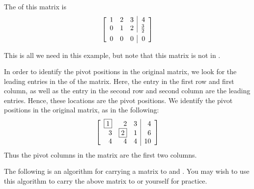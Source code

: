 \begin{solution} 
The \ef \;of this matrix is
\begin{equation*}
\leftB
\begin{array}{rrr|r}
1 & 2 & 3 & 4 \\
0 & 1 & 2 & \vspace{0.05in}\frac{3}{2} \\
0 & 0 & 0 & 0
\end{array}
\rightB
\end{equation*}




This is all we need in this example, but note that this matrix is not in \rref.

In order to identify the pivot positions in the original matrix, we look for the leading entries in the \ef \hspace{0.5mm} of the matrix. 
Here, the entry in the first row and first column, as well as the entry in the second row and second column 
are the leading entries. Hence, these locations are the pivot positions. We identify the pivot positions in the original matrix, 
as in the following:\
\begin{equation*}
\left[
\begin{array}{rrr|r}
\fbox{1} & 2 & 3 & 4 \\
3 & \fbox{2} & 1 & 6 \\
4 & 4 & 4 & 10
\end{array}
\right]
\end{equation*}
Thus the pivot columns in the matrix are the first two columns. 
\end{solution}

The following is an algorithm for carrying a matrix
to \ef \;and \rref. You may wish to use this algorithm to carry the above matrix to \ef \;or \rref \;yourself for practice. 


